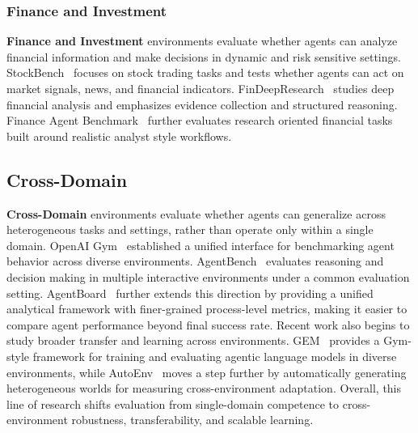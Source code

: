 \subsubsection{Finance and Investment}
\label{Finance}
\textbf{Finance and Investment} environments evaluate whether agents can analyze financial information and make decisions in dynamic and risk sensitive settings. StockBench~\cite{StockBench} focuses on stock trading tasks and tests whether agents can act on market signals, news, and financial indicators. FinDeepResearch~\cite{FinDeepResearch} studies deep financial analysis and emphasizes evidence collection and structured reasoning. Finance Agent Benchmark~\cite{Finance_Agent_Benchmark} further evaluates research oriented financial tasks built around realistic analyst style workflows.



\subsection{Cross-Domain}
\label{Cross-Domain}
\textbf{Cross-Domain} environments evaluate whether agents can generalize across heterogeneous tasks and settings, rather than operate only within a single domain. OpenAI Gym~\cite{Openai_gym} established a unified interface for benchmarking agent behavior across diverse environments. AgentBench~\cite{AgentBench} evaluates reasoning and decision making in multiple interactive environments under a common evaluation setting. AgentBoard~\cite{AgentBoard} further extends this direction by providing a unified analytical framework with finer-grained process-level metrics, making it easier to compare agent performance beyond final success rate. Recent work also begins to study broader transfer and learning across environments. GEM~\cite{GEM} provides a Gym-style framework for training and evaluating agentic language models in diverse environments, while AutoEnv~\cite{AutoEnv} moves a step further by automatically generating heterogeneous worlds for measuring cross-environment adaptation. Overall, this line of research shifts evaluation from single-domain competence to cross-environment robustness, transferability, and scalable learning.

